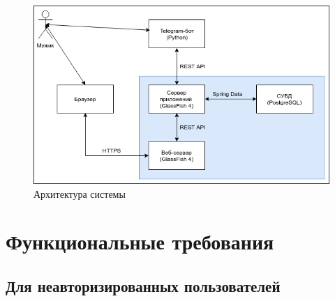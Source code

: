 \documentclass[12pt, a4paper]{article}
\begin{document}
\begin{figure}[H]
  \centering
  \includegraphics[width=16cm]{system-arch.png}
  \caption{Архитектура системы}
\end{figure}

\section{Функциональные требования}

\subsection{Для неавторизированных пользователей}
\end{document}
